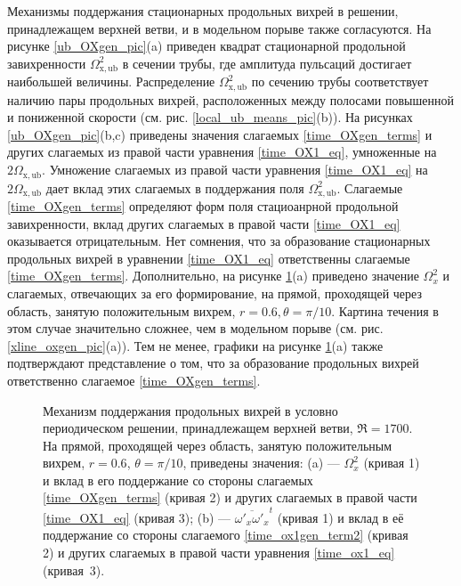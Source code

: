 Механизмы поддержания стационарных продольных вихрей в решении, принадлежащем верхней ветви, и в модельном порыве также согласуются. На рисунке \ref{ub_OXgen_pic}(a) приведен квадрат стационарной продольной завихренности $\Omega_\mathrm{x, ub}^2$ в сечении трубы, где амплитуда пульсаций достигает наибольшей величины. Распределение $\Omega_\mathrm{x,ub}^2$ по сечению трубы соответствует наличию пары продольных вихрей, расположенных между полосами повышенной и пониженной скорости (см. рис. \ref{local_ub_means_pic}(b)). На рисунках \ref{ub_OXgen_pic}(b,c) приведены значения слагаемых \eqref{time_OXgen_terms} и других слагаемых из правой части уравнения \eqref{time_OX1_eq}, умноженные на $2\Omega_\mathrm{x,ub}$. Умножение слагаемых из правой части уравнения \eqref{time_OX1_eq} на $2\Omega_\mathrm{x,ub}$ дает вклад этих слагаемых в поддержания поля $\Omega_\mathrm{x,ub}^2$. Слагаемые \eqref{time_OXgen_terms} определяют форм поля стациоанрной продольной завихренности, вклад других слагаемых в правой части \eqref{time_OX1_eq} оказывается отрицательным. Нет сомнения, что за образование стационарных продольных вихрей в уравнении \eqref{time_OX1_eq} ответственны слагаемые \eqref{time_OXgen_terms}. Дополнительно, на рисунке \ref{ub_oxgen_lines_pic}(a) приведено значение $\Omega_x^2$ и слагаемых, отвечающих за его формирование, на прямой, проходящей через область, занятую положительным вихрем, $r = 0.6, \theta = \pi/10$. Картина течения в этом случае значительно сложнее, чем в модельном порыве (см. рис. \ref{xline_oxgen_pic}(a)). Тем не менее, графики на рисунке \ref{ub_oxgen_lines_pic}(a) также подтверждают представление о том, что за образование продольных вихрей ответственно слагаемое \eqref{time_OXgen_terms}. 
 

\begin{figure}
\caption{Механизм поддержания продольных вихрей в условно периодическом решении, принадлежащем верхней ветви, $\Re = 1700$. На прямой, проходящей через область, занятую положительным вихрем, $r = 0.6$, $\theta = \pi/10$, приведены значения: (a) --- $\Omega_x^2$ (кривая 1) и вклад в его поддержание со стороны слагаемых \eqref{time_OXgen_terms} (кривая 2) и других слагаемых в правой части \eqref{time_OX1_eq} (кривая 3); (b) --- $\overline{\omega'_x\omega'_x}^t$ (кривая 1) и вклад в её поддержание со стороны слагаемого \eqref{time_ox1gen_term2} (кривая 2) и других слагаемых в правой части уравнения \eqref{time_ox1_eq} (кривая~3).} 
\label{ub_oxgen_lines_pic}
\end{figure}


